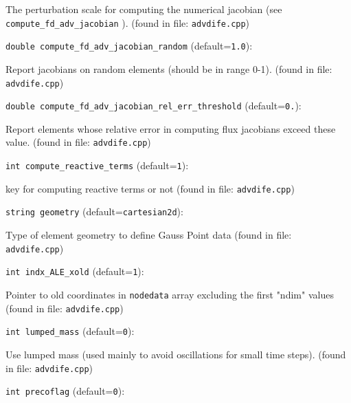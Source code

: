 The perturbation scale for computing the numerical jacobian
 (see \verb+compute_fd_adv_jacobian+ ).
 (found in file: \verb+advdife.cpp+)
\item\verb+double compute_fd_adv_jacobian_random+ {\rm(default=\verb|1.0|)}:

Report jacobians on random elements (should be in range 0-1).
 (found in file: \verb+advdife.cpp+)
\item\verb+double compute_fd_adv_jacobian_rel_err_threshold+ {\rm(default=\verb|0.|)}:

Report elements whose relative error in computing
 flux jacobians exceed these value.
 (found in file: \verb+advdife.cpp+)
\item\verb+int compute_reactive_terms+ {\rm(default=\verb|1|)}:

key for computing reactive terms or not
 (found in file: \verb+advdife.cpp+)
\item\verb+string geometry+ {\rm(default=\verb|cartesian2d|)}:

Type of element geometry to define Gauss Point data
 (found in file: \verb+advdife.cpp+)
\item\verb+int indx_ALE_xold+ {\rm(default=\verb|1|)}:

Pointer to old coordinates in
 \verb+nodedata+ array excluding the first "ndim" values
 (found in file: \verb+advdife.cpp+)
\item\verb+int lumped_mass+ {\rm(default=\verb|0|)}:

Use lumped mass (used mainly to avoid oscillations for small time steps).
 (found in file: \verb+advdife.cpp+)
\item\verb+int precoflag+ {\rm(default=\verb|0|)}:

